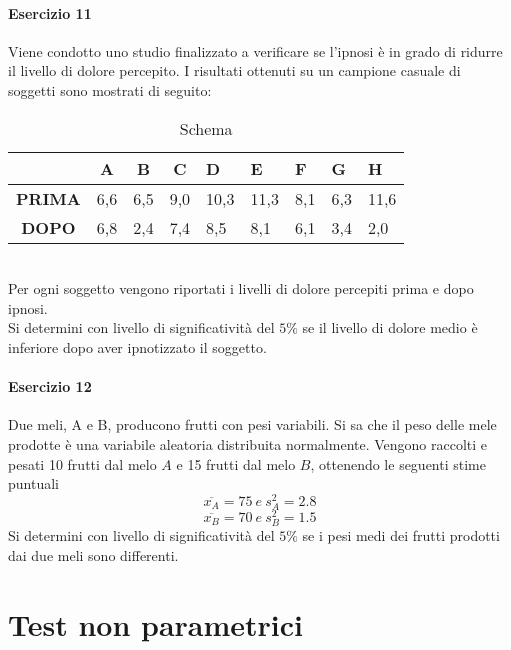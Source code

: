 \documentclass[12pt]{article}
\begin{document}
    \paragraph{Esercizio 11}
    Viene condotto uno studio finalizzato a verificare se l’ipnosi è in grado di ridurre il livello di dolore percepito. I risultati ottenuti su un campione casuale di soggetti sono mostrati di seguito:
    \begin{table}[htb]
        \centering
        \begin{tabular}{|c|c|c|c|l|l|l|l|l|}
        \hline
         &
          \textbf{A} &
          \textbf{B} &
          \textbf{C} &
          \textbf{D} &
          \textbf{E} &
          \textbf{F} &
          \textbf{G} &
          \textbf{H} \\ \hline
        \multicolumn{1}{|l|}{\textbf{PRIMA}} &
          \multicolumn{1}{l|}{6,6} &
          \multicolumn{1}{l|}{6,5} &
          \multicolumn{1}{l|}{9,0} &
          10,3 &
          11,3 &
          8,1 &
          6,3 &
          11,6 \\ \hline
        \textbf{DOPO} &
          6,8 &
          2,4 &
          7,4 &
          8,5 &
          8,1 &
          6,1 &
          3,4 &
          2,0 \\ \hline
        \end{tabular}
        \caption{Schema}
        \label{tab:my-table2}
    \end{table}
    \\Per ogni soggetto vengono riportati i livelli di dolore percepiti prima e dopo ipnosi.
    \\Si determini con livello di significatività del $5\%$ se il livello di dolore medio è inferiore dopo aver
    ipnotizzato il soggetto.
    \paragraph{Esercizio 12}
    Due meli, A e B, producono frutti con pesi variabili. Si sa che il peso delle mele prodotte è una variabile aleatoria distribuita normalmente. Vengono raccolti e pesati 10 frutti dal melo $A$ e 15 frutti dal melo $B$, ottenendo le seguenti stime puntuali
    $$\overline{x_A} = 75 \ e \ s^2_A = 2.8$$
    $$\overline{x_B} = 70 \ e \ s^2_B = 1.5$$
    Si determini con livello di significatività del $5\%$ se i pesi medi dei frutti prodotti dai due meli sono differenti.
    \newpage
    \section{Test non parametrici}
\end{document}
